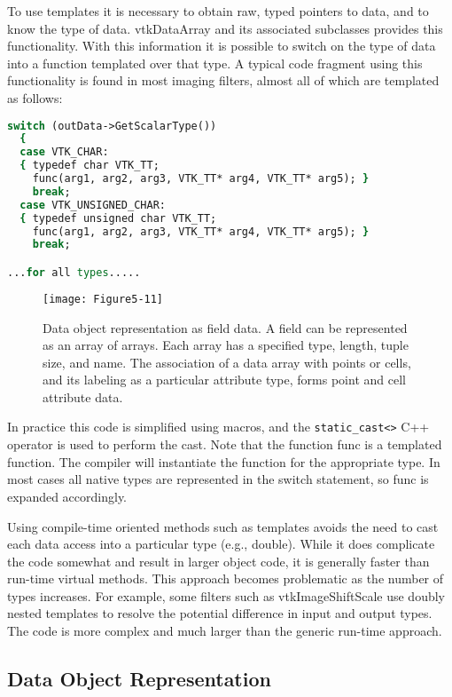 To use templates it is necessary to obtain raw, typed pointers to data, and to know the type of data. vtkDataArray and its associated subclasses provides this functionality. With this information it is possible to switch on the type of data into a function templated over that type. A typical code fragment using this functionality is found in most imaging filters, almost all of which are templated as follows:

\begin{lstlisting}[language=TCL, caption={Obtaining raw typed pointers to data.}]
switch (outData->GetScalarType())
  {
  case VTK_CHAR:
  { typedef char VTK_TT;
    func(arg1, arg2, arg3, VTK_TT* arg4, VTK_TT* arg5); }
    break;
  case VTK_UNSIGNED_CHAR:
  { typedef unsigned char VTK_TT;
    func(arg1, arg2, arg3, VTK_TT* arg4, VTK_TT* arg5); }
    break;

...for all types.....

\end{lstlisting}

\begin{figure}[!htb]
	\centering
	\texttt{[image: Figure5-11]}
	\caption{Data object representation as field data. A field can be represented as an array of arrays. Each array has a specified type, length, tuple size, and name. The association of a data array with points or cells, and its labeling as a particular attribute type, forms point and cell attribute data.}
	\label{fig:Figure5-11}
\end{figure}

In practice this code is simplified using macros, and the \texttt{static\_cast<>} C++ operator is used to perform the cast. Note that the function func is a templated function. The compiler will instantiate the function for the appropriate type. In most cases all native types are represented in the switch statement, so func is expanded accordingly.

Using compile-time oriented methods such as templates avoids the need to cast each data access into a particular type (e.g., double). While it does complicate the code somewhat and result in larger object code, it is generally faster than run-time virtual methods. This approach becomes problematic as the number of types increases. For example, some filters such as vtkImageShiftScale use doubly nested templates to resolve the potential difference in input and output types. The code is more complex and much larger than the generic run-time approach.

\subsection{Data Object Representation}

